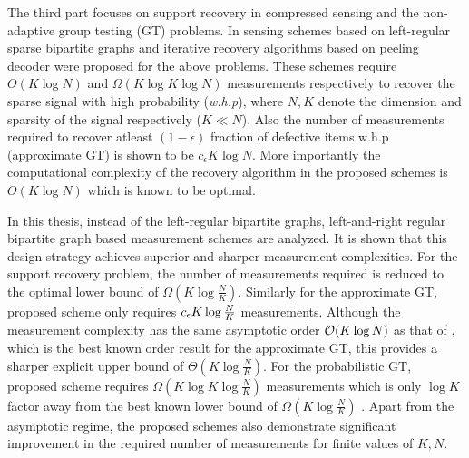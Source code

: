 \indent The third part focuses on support recovery in compressed sensing and the non-adaptive group testing (GT) problems. In \cite{li2015subdraft,lee2015saffron} sensing schemes based on left-regular sparse bipartite graphs and iterative recovery algorithms based on peeling decoder were proposed for the above problems. These schemes require $O(K \log N)$ and $ \Omega(K\log K\log N)$ measurements respectively to recover the sparse signal with high probability (\emph{w.h.p}), where $N,K$ denote the dimension and sparsity of the signal respectively ($K\ll N$). Also the number of measurements required to recover atleast $(1-\epsilon)$ fraction of defective items w.h.p (approximate GT) is shown to be $c_\epsilon K\log N$. More importantly the computational complexity of the recovery algorithm in the proposed schemes is $O(K \log N)$ which is known to be optimal.

In this thesis, instead of the left-regular bipartite graphs, left-and-right regular bipartite graph based measurement schemes are analyzed. It is shown that this design strategy achieves superior and sharper measurement complexities. For the support recovery problem, the number of measurements required is reduced to the optimal lower bound of $\Omega\left(K \log \frac{N}{K} \right)$. Similarly for the approximate GT, proposed scheme only requires $c_{\epsilon} K\log \frac{N}{K}$ measurements. Although the measurement complexity has the same asymptotic order $\mathcal{O}(K\log N)$ as that of \cite{lee2015saffron}, which is the best known order result for the approximate GT, this provides a sharper explicit upper bound of $\Theta(K\log \frac{N}{K})$. For the probabilistic GT, proposed scheme requires $\Omega(K\log K \log \frac{N}{K})$ measurements which is only $\log K$ factor away from the best known lower bound of $\Omega(K\log \frac{N}{K})$ \cite{chan2014non}. Apart from the asymptotic regime, the proposed schemes also demonstrate significant improvement in the required number of measurements for finite values of $K,N$. 


